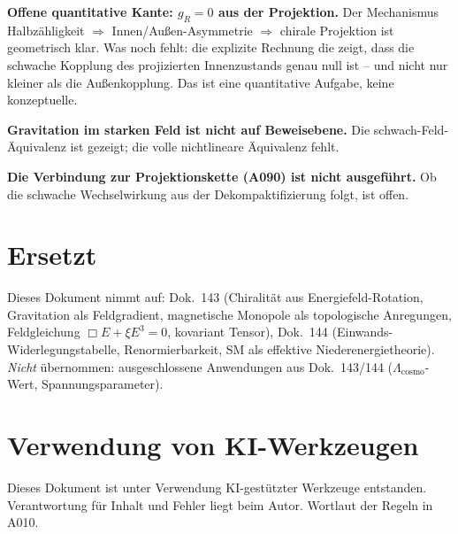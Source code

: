 \textbf{Offene quantitative Kante: $g_R=0$ aus der Projektion.}
Der Mechanismus Halbzähligkeit $\Rightarrow$ Innen/Außen-Asymmetrie $\Rightarrow$
chirale Projektion ist geometrisch klar. Was noch fehlt: die explizite Rechnung
die zeigt, dass die schwache Kopplung des projizierten Innenzustands genau null
ist -- und nicht nur kleiner als die Außenkopplung. Das ist eine quantitative
Aufgabe, keine konzeptuelle.

\textbf{Gravitation im starken Feld ist nicht auf Beweisebene.} Die schwach-Feld-
Äquivalenz ist gezeigt; die volle nichtlineare Äquivalenz fehlt.

\textbf{Die Verbindung zur Projektionskette (A090) ist nicht ausgeführt.} Ob die
schwache Wechselwirkung aus der Dekompaktifizierung folgt, ist offen.

\section{Ersetzt}

Dieses Dokument nimmt auf: Dok.~143 (Chiralität aus Energiefeld-Rotation, Gravitation
als Feldgradient, magnetische Monopole als topologische Anregungen, Feldgleichung
$\Box E+\xi E^3=0$, kovariant Tensor), Dok.~144 (Einwands-Widerlegungstabelle,
Renormierbarkeit, SM als effektive Niederenergietheorie). \emph{Nicht} übernommen:
ausgeschlossene Anwendungen aus Dok.~143/144 ($\Lambda_\text{cosmo}$-Wert, Spannungsparameter).

\section{Verwendung von KI-Werkzeugen}

Dieses Dokument ist unter Verwendung KI-gestützter Werkzeuge entstanden. Verantwortung
für Inhalt und Fehler liegt beim Autor. Wortlaut der Regeln in A010.
